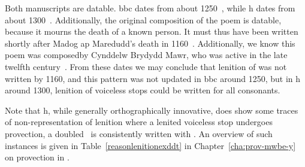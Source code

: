 Both manuscripts are datable. \Gls{bbc} dates from about 1250~\autocite[xxiv]{jones_rhagymadrodd_1982}, while \gls{h} dates from about 1300~\autocite{huws_llawysgrif_1981}. Additionally, the original composition of the poem is datable, because it mourns the death of a known person. It must thus have been written shortly after Madog ap Maredudd's death in 1160~\autocite[82]{jones_gwaith_1991}. Additionally, we know this poem was composedby Cynddelw Brydydd Mawr, who was active in the late twelfth century~\autocite[xxx]{jones_gwaith_1991}. From these dates we may conclude that lenition of  was  not written by 1160, and this pattern was  not updated in \gls{bbc} around 1250, but in \gls{h} around 1300, lenition of voiceless stops could be written for all consonants.

Note that \gls{h}, while generally orthographically innovative, does show some traces of non-representation of lenition where a lenited voiceless stop undergoes provection, \ie a doubled \lT\ is consistently written with . An overview of such instances is given in Table~\ref{reasonlenitionexddt} in Chapter~\ref{cha:prov-mwbe-y} on provection in .

